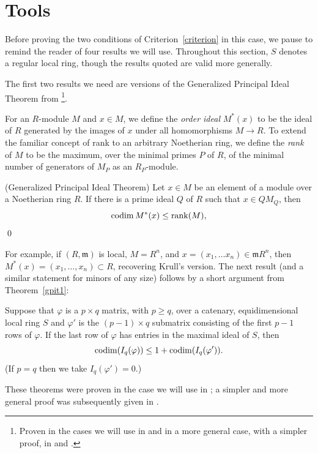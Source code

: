 \documentclass[11pt]{amsart}
\def\phi{{\varphi}}
\def\gm{{\mathfrak m}}
\begin{document}
\section{Tools}\label{sec:tools}
 
Before proving the two conditions of Criterion~\ref{criterion} in this case, we pause to remind the reader of four results we will use. Throughout this section, $S$ denotes a regular local ring,
though the results quoted are valid more generally.

The first two results we need are versions of
 the Generalized Principal Ideal Theorem from \cite{EisenbudEvans}\footnote{Proven in the cases we will use in \cite{EisenbudEvans} and in a more general case, with a simpler proof,  in \cite{Bruns} and \cite{EHU}.}. 

For an $R$-module $M$ and $x\in M$, we define the \emph{order ideal} $M^{*}(x)$ to be the ideal of $R$
generated by the images of $x$ under all homomorphisms $M \to R$. 
To extend the familiar concept of rank to an arbitrary Noetherian ring, we define
the \emph{rank} of $M$ to be the maximum, over the minimal primes $P$ of $R$,
 of the minimal number of generators of $M_P$ as an $R_P$-module. 

\begin{theorem}(Generalized Principal Ideal Theorem)\label{gpit1}
Let $x\in M$ be an element of a module  over a Noetherian ring $R$.
If there is a prime ideal $Q$ of $R$ such that $x \in Q M_{Q}$, then
$$
\operatorname{codim} M^{*}(x) \leq \operatorname{rank}(M),
$$
\qed
\end{theorem}

For example, if $(R,\gm)$ is local, $M = R^{n}$, and $x = (x_{1}, \dots x_{n})\in \gm R^{n}$, then
$M^{*}(x) = (x_{1}, \dots, x_{n})\subset R$, recovering Krull's version. The next result (and a similar statement for minors of any size) follows
by a short argument from Theorem~\ref{gpit1}:

\begin{theorem}\label{gpit2}
 Suppose that $\phi$ is a $p\times q$ matrix, with $p\geq q$, over a
 catenary, equidimensional local ring $S$  and $\phi'$ is the $(p-1)\times q$
 submatrix consisting of the first $p-1$ rows of $\phi$. If the last row of
 $\phi$ has entries in the maximal ideal of $S$, then
 $$
 \codim (I_{q}(\phi)) \leq 1+\codim (I_{q}(\phi')).
 $$
 (If $p=q$ then we take $I_{q}(\phi') = 0$.)
 \end{theorem}

These theorems were proven in the case we will use in \cite[Theorems 1.1 and 2.1] {EisenbudEvans}; a simpler and more general proof was subsequently given in \cite[Theorem 1 and Corollary 1] {Bruns}.
\end{document}

